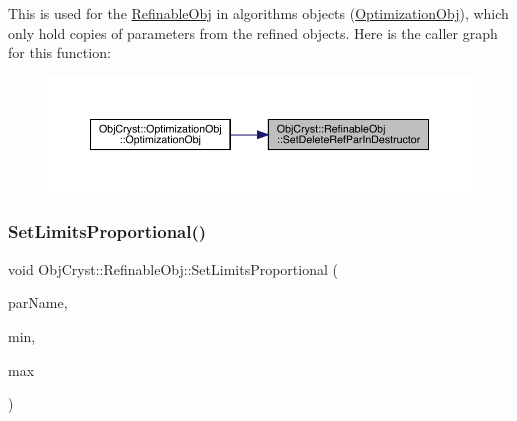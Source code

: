 This is used for the \mbox{\hyperlink{class_obj_cryst_1_1_refinable_obj}{Refinable\+Obj}} in algorithms objects (\mbox{\hyperlink{class_obj_cryst_1_1_optimization_obj}{Optimization\+Obj}}), which only hold copies of parameters from the refined objects. Here is the caller graph for this function\+:
\nopagebreak
\begin{figure}[H]
\begin{center}
\leavevmode
\includegraphics[width=350pt]{class_obj_cryst_1_1_refinable_obj_a33f94e9c9c0717ea77c8b9427e9e137e_icgraph}
\end{center}
\end{figure}
\mbox{\label{class_obj_cryst_1_1_refinable_obj_adc6b05a95d524d600910a47861190e84}} 
\subsubsection{\texorpdfstring{SetLimitsProportional()}{SetLimitsProportional()}\hspace{0.1cm}{\footnotesize\ttfamily [1/2]}}
{\footnotesize\ttfamily void Obj\+Cryst\+::\+Refinable\+Obj\+::\+Set\+Limits\+Proportional (\begin{DoxyParamCaption}\item[{const string \&}]{par\+Name,  }\item[{const R\+E\+AL}]{min,  }\item[{const R\+E\+AL}]{max }\end{DoxyParamCaption})}

